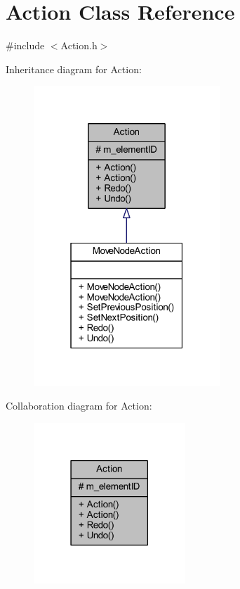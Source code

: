 \hypertarget{class_action}{}\section{Action Class Reference}
\label{class_action}


{\ttfamily \#include $<$Action.\+h$>$}



Inheritance diagram for Action\+:
\nopagebreak
\begin{figure}[H]
\begin{center}
\leavevmode
\includegraphics[width=199pt]{class_action__inherit__graph}
\end{center}
\end{figure}


Collaboration diagram for Action\+:
\nopagebreak
\begin{figure}[H]
\begin{center}
\leavevmode
\includegraphics[width=162pt]{class_action__coll__graph}
\end{center}
\end{figure}
